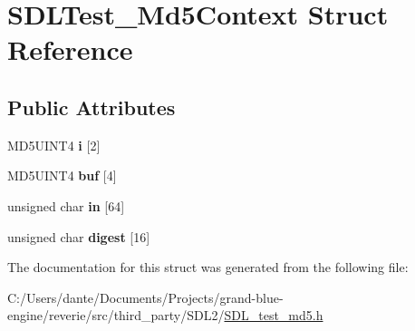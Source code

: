 \hypertarget{struct_s_d_l_test___md5_context}{}\section{S\+D\+L\+Test\+\_\+\+Md5\+Context Struct Reference}
\label{struct_s_d_l_test___md5_context}
\subsection*{Public Attributes}
\begin{DoxyCompactItemize}
\item 
\mbox{\label{struct_s_d_l_test___md5_context_a95b3d5fd74fd1b7a27bf96f3bb32beb4}} 
M\+D5\+U\+I\+N\+T4 {\bfseries i} \mbox{[}2\mbox{]}
\item 
\mbox{\label{struct_s_d_l_test___md5_context_a061f0cead7ec49ac4c5baf0bbd9c13a7}} 
M\+D5\+U\+I\+N\+T4 {\bfseries buf} \mbox{[}4\mbox{]}
\item 
\mbox{\label{struct_s_d_l_test___md5_context_a337638ef799dc0ad9397ea9b175ea388}} 
unsigned char {\bfseries in} \mbox{[}64\mbox{]}
\item 
\mbox{\label{struct_s_d_l_test___md5_context_ab29079997a9f35e5d52c2aac3ad28f90}} 
unsigned char {\bfseries digest} \mbox{[}16\mbox{]}
\end{DoxyCompactItemize}


The documentation for this struct was generated from the following file\+:\begin{DoxyCompactItemize}
\item 
C\+:/\+Users/dante/\+Documents/\+Projects/grand-\/blue-\/engine/reverie/src/third\+\_\+party/\+S\+D\+L2/\mbox{\hyperlink{_s_d_l__test__md5_8h}{S\+D\+L\+\_\+test\+\_\+md5.\+h}}\end{DoxyCompactItemize}
